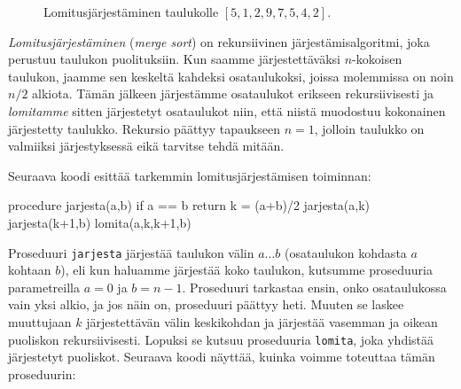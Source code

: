 \begin{figure}
\caption{Lomitusjärjestäminen taulukolle $[5,1,2,9,7,5,4,2]$.}
\label{fig:lomjar}
\end{figure}

\emph{Lomitusjärjestäminen} (\emph{merge sort}) on rekursiivinen järjestämisalgoritmi,
joka perustuu taulukon puolituksiin.
Kun saamme järjestettäväksi $n$-kokoisen taulukon,
jaamme sen keskeltä kahdeksi osataulukoksi,
joissa molemmissa on noin $n/2$ alkiota.
Tämän jälkeen järjestämme osataulukot erikseen rekursiivisesti
ja \emph{lomitamme} sitten järjestetyt osataulukot niin,
että niistä muodostuu kokonainen järjestetty taulukko.
Rekursio päättyy tapaukseen $n=1$, jolloin
taulukko on valmiiksi järjestyksessä eikä
tarvitse tehdä mitään.

Seuraava koodi esittää tarkemmin lomitusjärjestämisen toiminnan:

\begin{code}
procedure jarjesta(a,b)
    if a == b
        return
    k = (a+b)/2
    jarjesta(a,k)
    jarjesta(k+1,b)
    lomita(a,k,k+1,b)
\end{code}

Proseduuri \texttt{jarjesta} järjestää taulukon
välin $a \dots b$ (osataulukon kohdasta
$a$ kohtaan $b$), eli kun haluamme järjestää koko taulukon,
kutsumme proseduuria parametreilla $a=0$ ja $b=n-1$.
Proseduuri tarkastaa ensin, onko osataulukossa vain yksi alkio,
ja jos näin on, proseduuri päättyy heti.
Muuten se laskee muuttujaan $k$ järjestettävän välin keskikohdan
ja järjestää vasemman ja oikean puoliskon rekursiivisesti.
Lopuksi se kutsuu proseduuria \texttt{lomita},
joka yhdistää järjestetyt puoliskot.
Seuraava koodi näyttää, kuinka voimme toteuttaa tämän proseduurin:

